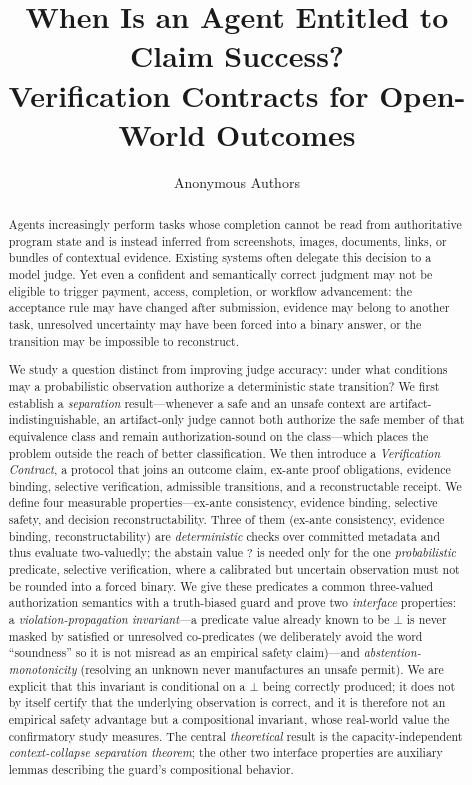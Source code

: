 \documentclass[sigconf,anonymous,review]{acmart}
\title{When Is an Agent Entitled to Claim Success?\\Verification Contracts for Open-World Outcomes}
\author{Anonymous Authors}
\begin{document}
\begin{abstract}
Agents increasingly perform tasks whose completion cannot be read from authoritative program state and is instead inferred from screenshots, images, documents, links, or bundles of contextual evidence. Existing systems often delegate this decision to a model judge. Yet even a confident and semantically correct judgment may not be eligible to trigger payment, access, completion, or workflow advancement: the acceptance rule may have changed after submission, evidence may belong to another task, unresolved uncertainty may have been forced into a binary answer, or the transition may be impossible to reconstruct.

We study a question distinct from improving judge accuracy: under what conditions may a probabilistic observation authorize a deterministic state transition? We first establish a \emph{separation} result---whenever a safe and an unsafe context are artifact-indistinguishable, an artifact-only judge cannot both authorize the safe member of that equivalence class and remain authorization-sound on the class---which places the problem outside the reach of better classification. We then introduce a \emph{Verification Contract}, a protocol that joins an outcome claim, ex-ante proof obligations, evidence binding, selective verification, admissible transitions, and a reconstructable receipt. We define four measurable properties---ex-ante consistency, evidence binding, selective safety, and decision reconstructability. Three of them (ex-ante consistency, evidence binding, reconstructability) are \emph{deterministic} checks over committed metadata and thus evaluate two-valuedly; the abstain value $?$ is needed only for the one \emph{probabilistic} predicate, selective verification, where a calibrated but uncertain observation must not be rounded into a forced binary. We give these predicates a common three-valued authorization semantics with a truth-biased guard and prove two \emph{interface} properties: a \emph{violation-propagation invariant}---a predicate value already known to be $\bot$ is never masked by satisfied or unresolved co-predicates (we deliberately avoid the word ``soundness'' so it is not misread as an empirical safety claim)---and \emph{abstention-monotonicity} (resolving an unknown never manufactures an unsafe permit). We are explicit that this invariant is conditional on a $\bot$ being correctly produced; it does not by itself certify that the underlying observation is correct, and it is therefore not an empirical safety advantage but a compositional invariant, whose real-world value the confirmatory study measures. The central \emph{theoretical} result is the capacity-independent \emph{context-collapse separation theorem}; the other two interface properties are auxiliary lemmas describing the guard's compositional behavior.


\end{abstract}
\end{document}
